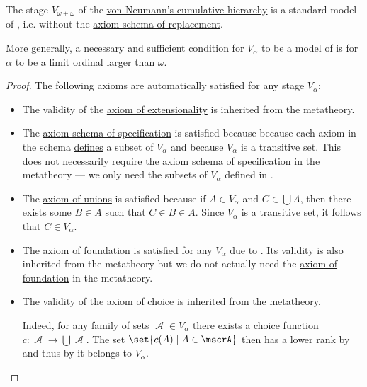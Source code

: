 \begin{theorem}\label{thm:cumulative_hierarchy_model_of_z}
  The stage \( V_{\omega + \omega} \) of the \hyperref[def:cumulative_hierarchy]{von Neumann's cumulative hierarchy} is a standard model of , i.e.  without the \hyperref[def:zfc/replacement]{axiom schema of replacement}.

  More generally, a necessary and sufficient condition for \( V_\alpha \) to be a model of  is for \( \alpha \) to be a limit ordinal larger than \( \omega \).
\end{theorem}
\begin{proof}
  The following axioms are automatically satisfied for any stage \( V_\alpha \):
  \begin{itemize}
    \item The validity of the \hyperref[def:zfc/extensionality]{axiom of extensionality} is inherited from the metatheory.

    \item The \hyperref[def:zfc/specification]{axiom schema of specification} is satisfied because because each axiom in the schema \hyperref[def:first_order_definability]{defines} a subset of \( V_\alpha \) and because \( V_\alpha \) is a transitive set. This does not necessarily require the axiom schema of specification in the metatheory --- we only need the subsets of \( V_\alpha \) defined in .

    \item The \hyperref[def:zfc/union]{axiom of unions} is satisfied because if \( A \in V_\alpha \) and \( C \in \bigcup A \), then there exists some \( B \in A \) such that \( C \in B \in A \). Since \( V_\alpha \) is a transitive set, it follows that \( C \in V_\alpha \).

    \item The \hyperref[def:zfc/foundation]{axiom of foundation} is satisfied for any \( V_\alpha \) due to . Its validity is also inherited from the metatheory but we do not actually need the \hyperref[def:zfc/foundation]{axiom of foundation} in the metatheory.

    \item The validity of the \hyperref[def:zfc/choice]{axiom of choice} is inherited from the metatheory.

    Indeed, for any family of sets \( \mscrA \in V_\alpha \) there exists a \hyperref[def:choice_function]{choice function} \( c: \mscrA \to \bigcup \mscrA \). The set \( \set{ c(A) \given A \in \mscrA } \) then has a lower rank by  and thus by  it belongs to \( V_\alpha \).
  \end{itemize}


\end{proof}
